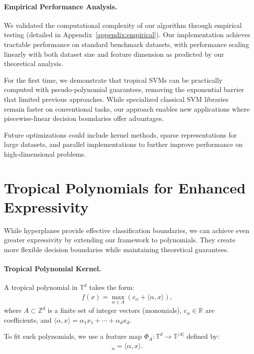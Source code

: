 \documentclass{article}
\newcommand{\R}{\mathbb{R}}
\newcommand{\trop}{\mathbb{T}}
\begin{document}
\paragraph{Empirical Performance Analysis.}
We validated the computational complexity of our algorithm through empirical testing (detailed in Appendix~\ref{appendix:empirical}). Our implementation achieves tractable performance on standard benchmark datasets, with performance scaling linearly with both dataset size and feature dimension as predicted by our theoretical analysis.

For the first time, we demonstrate that tropical SVMs can be practically computed with pseudo-polynomial guarantees, removing the exponential barrier that limited previous approaches. While specialized classical SVM libraries remain faster on conventional tasks, our approach enables new applications where piecewise-linear decision boundaries offer advantages.

Future optimizations could include kernel methods, sparse representations for large datasets, and parallel implementations to further improve performance on high-dimensional problems.

\section{Tropical Polynomials for Enhanced Expressivity}\label{sec:polynomials}

While hyperplanes provide effective classification boundaries, we can achieve even greater expressivity by extending our framework to polynomials. They create more flexible decision boundaries while maintaining theoretical guarantees.

\paragraph{Tropical Polynomial Kernel.}
A tropical polynomial in $\trop^d$ takes the form:
\begin{align}
f(x) = \max_{\alpha \in A} (c_\alpha + \langle \alpha, x \rangle),
\end{align}
where $A \subset \mathbb{Z}^d$ is a finite set of integer vectors (monomials), $c_\alpha \in \R$ are coefficients, and $\langle \alpha, x \rangle = \alpha_1 x_1 + \cdots + \alpha_d x_d$.

To fit such polynomials, we use a feature map $\Phi_A: \trop^d \to \trop^{|A|}$ defined by:
\begin{align}
[\Phi_A(x)]_\alpha = \langle \alpha, x \rangle.
\end{align}
\end{document}
